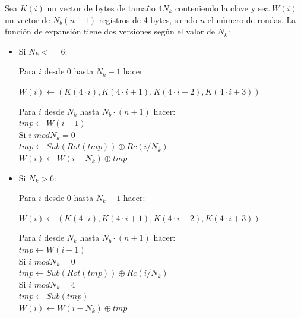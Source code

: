 Sea $K(i)$ un vector de bytes de tamaño $4N_k$ conteniendo la clave y sea $W(i)$ un vector de $N_b(n+1)$ registros de 4 bytes, siendo $n$ el número de rondas. 
La función de expansión tiene dos versiones según el valor de $N_k$:

\begin{itemize}
	\item Si $N_k<=6$:
	\begin{algorithm}
		Para $i$ desde 0 hasta $N_{k}-1$ hacer:
		\begin{description}
			$W(i)\leftarrow(K(4·i), K(4·i+1), K(4·i+2), K(4·i+3))$
		\end{description}
		Para $i$ desde $N_k$ hasta $N_{b}·(n+1)$ hacer:\\
			\hspace*{20}$tmp\leftarrow W(i-1)$\\
			\hspace*{20}Si $i$ $mod N_k = 0$\\
			\hspace*{40}$tmp\leftarrow Sub(Rot(tmp))\oplus Rc(i/N_k)$\\
			\hspace*{20}$W(i)\leftarrow W(i-N_k)\oplus tmp$
	\end{algorithm}

	\item Si $N_k>6$:
	\begin{algorithm}
		Para $i$ desde 0 hasta $N_{k}-1$ hacer:
		\begin{description}
			$W(i)\leftarrow(K(4·i), K(4·i+1), K(4·i+2), K(4·i+3))$
		\end{description}
		Para $i$ desde $N_k$ hasta $N_{b}·(n+1)$ hacer:\\
			\hspace*{20}$tmp\leftarrow W(i-1)$\\
			\hspace*{20}Si $i$ $mod N_k = 0$\\
			\hspace*{40}$tmp\leftarrow Sub(Rot(tmp))\oplus Rc(i/N_k)$\\
			\hspace*{20}Si $i$ $mod N_k = 4$\\
			\hspace*{40}$tmp\leftarrow Sub(tmp)$\\
			\hspace*{20}$W(i)\leftarrow W(i-N_k)\oplus tmp$
	\end{algorithm}
\end{itemize}

